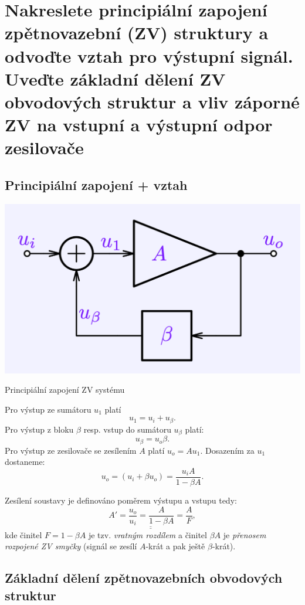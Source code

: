\documentclass[a4paper,12pt]{article}   %
\begin{document}
\section{Nakreslete principiální zapojení zpětnovazební (ZV) struktury a odvoďte vztah pro výstupní signál. Uveďte základní dělení ZV obvodových struktur a vliv záporné ZV na vstupní a výstupní odpor zesilovače}
\subsection*{Principiální zapojení + vztah}


\begin{schema}[h!]
    \centering
    \includegraphics[width=.5\textwidth]{ZV_princip.png}
    \caption{Principiální zapojení ZV systému}
    \label{fig:zv:princip}
\end{schema}

Pro výstup ze sumátoru $u_\text{1}$ platí
\begin{equation*}
    u_\text{1} = u_i + u_\beta.
\end{equation*}
Pro výstup z bloku $\beta$ resp. vstup do sumátoru $u_\beta$ platí:
\begin{equation*}
    u_\beta = u_o \beta.
\end{equation*}
Pro výstup ze zesilovače se zesílením $A$ platí $u_o = A u_\text{1}$. Dosazením za $u_\text{1}$ dostaneme:
\begin{equation*}
    u_o = (u_i + \beta u_o) = \frac{u_i A}{1-\beta A}.
\end{equation*}

Zesílení soustavy je definováno poměrem výstupu a vstupu tedy:
\begin{equation}
    \underline{\underline{A' = \frac{u_o}{u_i} = \frac{A}{1-\beta A} = \frac{A}{F}}},
\end{equation}
kde činitel $F = 1-\beta A$ je tzv. \textit{vratným rozdílem} a činitel $\beta A$ je \textit{přenosem rozpojené ZV smyčky} (signál se zesílí $A$-krát a pak ještě $\beta$-krát). 

\subsection*{Základní dělení zpětnovazebních obvodových struktur}
\end{document}
